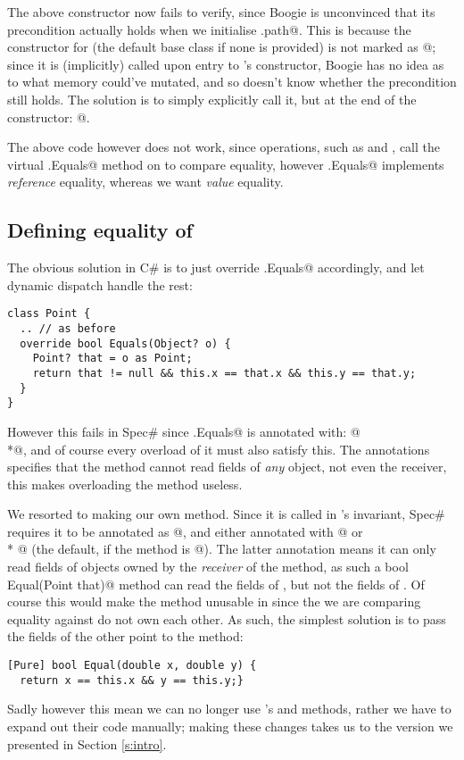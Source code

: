 The above constructor now fails to verify, since Boogie is unconvinced that its precondition actually holds when we initialise \Q@this.path@. This is because the constructor for \Q@Object@ (the default base class if none is provided) is not marked as \Q@[Pure]@; since it is (implicitly) called upon entry to \Q@Cage@'s constructor, Boogie has no idea as to what memory could've mutated, and so doesn't know whether the precondition still holds. The solution is to simply explicitly call it, but at the end of the constructor: @.

The above \Q@Cage@ code however does not work, since \Q@List@ operations, such as \Q@Contains@ and \Q@IndexOf@, call the virtual \Q@Object.Equals@ method on \Q@Point@s to compare equality, however \Q@Object.Equals@ implements \emph{reference} equality, whereas we want \emph{value} equality.

\subsection{Defining equality of \Q@Point@s}
The obvious solution in C\# is to just override \Q@Object.Equals@ accordingly, and let dynamic dispatch handle the rest:
\begin{lstlisting}
class Point {
  .. // as before
  override bool Equals(Object? o) {
    Point? that = o as Point;
    return that != null && this.x == that.x && this.y == that.y;
  }
}
\end{lstlisting}
However this fails in Spec\# since \Q@Object.Equals@ is annotated with: \Q@[Pure]@\\*@, and of course every overload of it must also satisfy this. The \Q@Reads@ annotations specifies that the method cannot read fields of \emph{any} object, not even the receiver, this makes overloading the method useless.

We resorted to making our own \Q@Equal@ method. Since it is called in \Q@Cage@'s invariant, Spec\# requires it to be annotated as \Q@[Pure]@, and either annotated with @ or\\* @ (the default, if the method is \Q@[Pure]@). The latter annotation means it can only read fields of objects owned by the \emph{receiver} of the method, as such a \Q@[Pure] bool Equal(Point that)@ method can read the fields of \Q@this@, but not the fields of \Q@that@. Of course this would make the method unusable in \Q@Cage@ since the \Q@Point@s we are comparing equality against do not own each other. As such, the simplest solution is to pass the fields of the other point to the method:
\begin{lstlisting}
[Pure] bool Equal(double x, double y) {
  return x == this.x && y == this.y;}
\end{lstlisting}

Sadly however this mean we can no longer use \Q@List@'s \Q@Contains@ and \Q@IndexOf@ methods, rather we have to expand out their code manually; making these changes takes us to the version we presented in Section \ref{s:intro}.